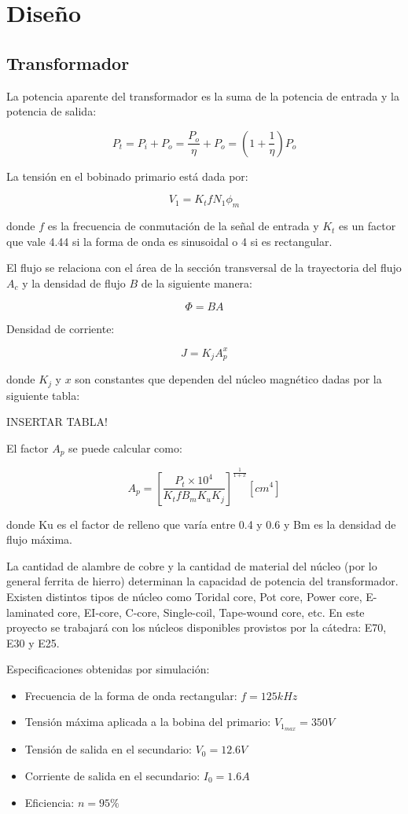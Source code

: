 \section{Diseño}

\subsection{Transformador}

La potencia aparente del transformador es la suma de la potencia de entrada y la potencia de salida:

$$ P_{t}=P_{i}+P_{o}=\frac{P_{o}}{\eta}+P_{o}=(1+\frac{1}{\eta})P_{o} $$

La tensión en el bobinado primario está dada por: 

$$ V_{1}=K_{t} f N_{1} \phi_{m} $$

donde $f$ es la frecuencia de conmutación de la señal de entrada y 
$K_t$ es un factor que vale 4.44 si la forma de onda es sinusoidal o 4 si es rectangular.

El flujo se relaciona con el área de la sección transversal de la trayectoria del flujo $A_{c}$ y la densidad de flujo $B$ de la siguiente manera:

$$ \Phi=BA $$

Densidad de corriente:

$$ J=K_{j} A_{p}^{x} $$

donde $K_{j}$ y $x$ son constantes que dependen del núcleo magnético dadas por la siguiente tabla:

INSERTAR TABLA!

El factor $A_{p}$ se puede calcular como: 

$$ A_{p}=\left[\frac{P_{t} \times 10^{4}}{K_{t} f B_{m} K_{u} K_{j}}\right]^{\frac{1}{1+x}} [{cm}^{4}] $$

donde Ku es el factor de relleno que varía entre 0.4 y 0.6 y Bm es la densidad de flujo máxima.

La cantidad de alambre de cobre y la cantidad de material del núcleo (por lo general ferrita de hierro) determinan la capacidad de potencia del transformador. 
Existen distintos tipos de núcleo como Toridal core, Pot core, Power core, E-laminated core, EI-core, C-core, Single-coil, Tape-wound core, etc. 
En este proyecto se trabajará con los núcleos disponibles provistos por la cátedra: E70, E30 y E25.  

Especificaciones obtenidas por simulación:
\begin{itemize}
    \item Frecuencia de la forma de onda rectangular: $f=125kHz$
    \item Tensión máxima aplicada a la bobina del primario: $V_{1_{max}}=350V$
    \item Tensión de salida en el secundario: $V_{0}=12.6V$
    \item Corriente de salida en el secundario: $I_{0}=1.6A$
    \item Eficiencia: $n=95\%$
\end{itemize}

